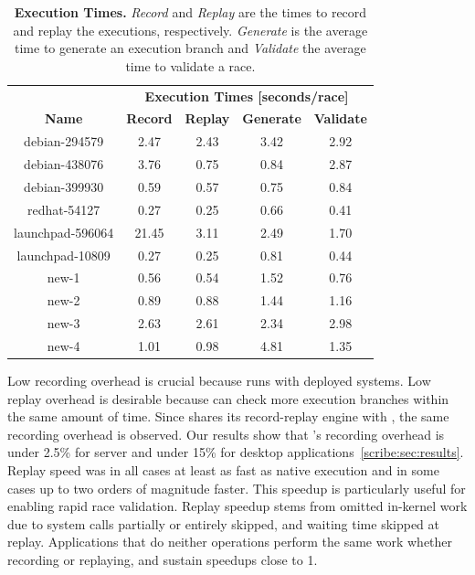 \begin{table}[t]
\centering
\begin{tabular}{c|cccc}
  \toprule
  & \multicolumn{4}{c}{\bf Execution Times [seconds/race]} \\
  {\bf Name} & {\bf Record} & {\bf Replay} & {\bf Generate} & {\bf Validate} \\
\midrule
debian-294579    &  2.47  &  2.43  &  3.42  &  2.92  \\
debian-438076    &  3.76  &  0.75  &  0.84  &  2.87  \\
debian-399930    &  0.59  &  0.57  &  0.75  &  0.84  \\
redhat-54127     &  0.27  &  0.25  &  0.66  &  0.41  \\
launchpad-596064 &  21.45 &  3.11  &  2.49  &  1.70  \\
launchpad-10809  &  0.27  &  0.25  &  0.81  &  0.44  \\
new-1            &  0.56  &  0.54  &  1.52  &  0.76  \\
new-2            &  0.89  &  0.88  &  1.44  &  1.16  \\
new-3            &  2.63  &  2.61  &  2.34  &  2.98  \\
new-4            &  1.01  &  0.98  &  4.81  &  1.35  \\
\bottomrule
\end{tabular}
\caption{{\bf \racepro Execution Times.}  {\em Record} and {\em Replay} are the
times to record and replay the executions, respectively. {\em Generate} is the
average time to generate an execution branch and {\em Validate} the average time
to validate a race.} \label{racepro:tab:bug-execution-times}
\end{table}

Low recording overhead is crucial because \racepro runs with deployed systems.
Low replay overhead is desirable because \racepro can check more execution
branches within the same amount of time. Since \racepro shares its record-replay
engine with \scribe, the same recording overhead is observed.
Our results show that \racepro's recording overhead is under 2.5\% for server
and under 15\% for desktop applications~\ref{scribe:sec:results}.
Replay speed was in all cases at least as fast as
native execution and in some cases up to two orders of magnitude faster.
This speedup is particularly useful for enabling rapid race validation.
Replay speedup stems from omitted in-kernel work due to system calls
partially or entirely skipped, and waiting time skipped at replay.
Applications that do neither operations perform the same work
whether recording or replaying, and sustain speedups close to 1.

